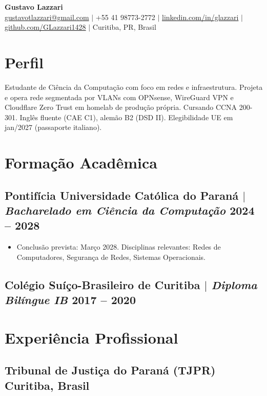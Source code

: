 \documentclass[10.5pt]{article}
\begin{document}
\begin{center}
    {\LARGE\bfseries Gustavo Lazzari} \\
    \vspace{2pt}
    \href{mailto:gustavotlazzari@gmail.com}{gustavotlazzari@gmail.com} $|$
    +55 41 98773-2772 $|$
    \href{https://www.linkedin.com/in/glazzari}{linkedin.com/in/glazzari} $|$
    \href{https://github.com/GLazzari1428}{github.com/GLazzari1428} $|$
    Curitiba, PR, Brasil
\end{center}

\section{Perfil}
Estudante de Ci\^{e}ncia da Computa\c{c}\~{a}o com foco em redes e infraestrutura. Projeta e opera
rede segmentada por VLANs com OPNsense, WireGuard VPN e Cloudflare Zero Trust em homelab de
produ\c{c}\~{a}o pr\'{o}pria. Cursando CCNA 200-301. Ingl\^{e}s fluente (CAE C1), alem\~{a}o B2 (DSD II).
Elegibilidade UE em jan/2027 (passaporte italiano).

\section{Forma\c{c}\~{a}o Acad\^{e}mica}
\subsection{Pontif\'{i}cia Universidade Cat\'{o}lica do Paran\'{a} $|$ {\normalfont\itshape Bacharelado em Ci\^{e}ncia da Computa\c{c}\~{a}o} \hfill 2024 -- 2028}
\begin{itemize}
    \item Conclus\~{a}o prevista: Mar\c{c}o 2028. Disciplinas relevantes: Redes de Computadores, Seguran\c{c}a de Redes, Sistemas Operacionais.
\end{itemize}
\subsection{Col\'{e}gio Su\'{i}\c{c}o-Brasileiro de Curitiba $|$ {\normalfont\itshape Diploma Bil\'{i}ngue IB} \hfill 2017 -- 2020}

\section{Experi\^{e}ncia Profissional}
\subsection{Tribunal de Justi\c{c}a do Paran\'{a} (TJPR) \hfill Curitiba, Brasil}
\end{document}
